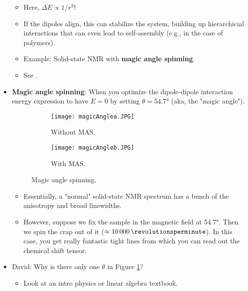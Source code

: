 \documentclass[../notes.tex]{subfiles}
\begin{document}
\begin{itemize}
\begin{figure}[h!]
        \label{fig:intDplDpl}
    \end{figure}
    \begin{itemize}
        \item Here, $\Delta E\propto 1/r^3$!
        \item If the dipoles align, this can stabilize the system, building up hierarchicial interactions that can even lead to self-assembly (e.g., in the case of polymers).
        \item Example: Solid-state NMR with \textbf{magic angle spinning}.
        \item See \textcite[168]{bib:Anslyn}.
    \end{itemize}
    \item \textbf{Magic angle spinning}: When you optimize the dipole-dipole interaction energy expression to have $E=0$ by setting $\theta=\ang{54.7}$ (aka, the "magic angle").
    \begin{figure}[h!]
        \centering
        \begin{subfigure}[b]{0.3\linewidth}
            \centering
            \texttt{[image: magicAnglea.JPG]}
            \caption{Without MAS.}
            \label{fig:magicAnglea}
        \end{subfigure}
        \begin{subfigure}[b]{0.3\linewidth}
            \centering
            \texttt{[image: magicAngleb.JPG]}
            \caption{With MAS.}
            \label{fig:magicAngleb}
        \end{subfigure}
        \caption{Magic angle spinning.}
        \label{fig:magicAngle}
    \end{figure}
    \begin{itemize}
        \item Essentially, a "normal" solid-state NMR spectrum has a bunch of the anisotropy and broad linewidths.
        \item However, suppose we fix the sample in the magnetic field at \ang{54.7}. Then we spin the crap out of it ($\approx\SI{10000}{\revolutionsperminute}$). In this case, you get really fantastic tight lines from which you can read out the chemical shift tensor.
    \end{itemize}
    \item David: Why is there only one $\theta$ in Figure \ref{fig:intDplDpl}?
    \begin{itemize}
        \item Look at an intro physics or linear algebra textbook.

\end{itemize}
\end{itemize}
\end{document}
